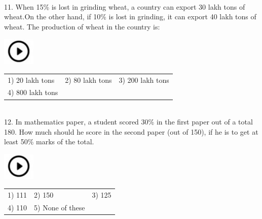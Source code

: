 \documentclass{article}
\begin{document}
\noindent 

\noindent \\


11. When 15\% is lost in grinding wheat, a country can export 30 lakh tons of wheat.On the other  hand, if 10\% is lost in grinding, it can export 40 lakh tons of wheat. The production of wheat in the country is:

\noindent 

\noindent   \includegraphics*[width=0.60in, height=0.52in]{images/image1} 
\begin{tabular}{p{1.7in} p{1.6in} p{1.6in}} \\ 
	1) 20 lakh tons          &  2) 80 lakh tons       &    3) 200 lakh tons              \\
	 4) 800 lakh tons  \\
\end{tabular}

                                              

\noindent 

\noindent                                        

\noindent 

\noindent \\
12. In mathematics paper, a student scored 30\% in the first paper out of a total 180. How much should he score in the second paper (out of 150), if he is to get at least 50\% marks of the total.

\noindent 

\noindent   \includegraphics*[width=0.60in, height=0.52in]{images/image1}   
\begin{tabular}{p{1.7in} p{1.6in} p{1.6in}} \\ 
1) 111           &   2) 150         &     3) 125           \\
 4) 110  &       5) None of these \\
\end{tabular}
                                                    

\noindent 

\noindent 

\noindent 
\end{document}
